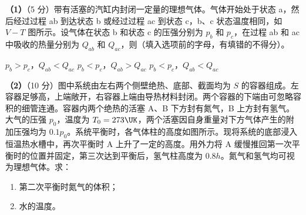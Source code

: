 \documentclass[\gkver]{gaokaozhenti}
\begin{document}
\begin{enumerate}
\textbf{（1）}（5 分）带有活塞的汽缸内封闭一定量的理想气体。气体开始处于状态 a，然后经过过程 ab 到达状态 b 或经过过程 ac 到状态 c，b、c 状态温度相同，如 $V-T$ 图所示。设气体在状态 b 和状态 c 的压强分别为 $p_{b}$ 和 $p_{c}$，在过程 ab 和 ac 中吸收的热量分别为 $Q_{ab}$ 和 $Q_{ac}$，则（填入选项前的字母，有填错的不得分）。


{$p_{b}>p_{c}$，$Q_{ab}<Q_{ac}$}
{$p_{b}<p_{c}$，$Q_{ab}>Q_{ac}$}
{$p_{b}<p_{c}$，$Q_{ab}<Q_{ac}$}

\textbf{（2）}（10 分）图中系统由左右两个侧壁绝热、底部、截面均为 $S$ 的容器组成。左容器足够高，上端敞开，右容器上端由导热材料封闭。两个容器的下端由可忽略容积的细管连通。容器内两个绝热的活塞 A、B 下方封有氮气，B 上方封有氢气。大气的压强 $p_{0}$，温度为 $T_{0}=273\UK$，两个活塞因自身重量对下方气体产生的附加压强均为 $0.1p_{0}$。系统平衡时，各气体柱的高度如图所示。现将系统的底部浸入恒温热水槽中，再次平衡时 A 上升了一定的高度。用外力将 A 缓慢推回第一次平衡时的位置并固定，第三次达到平衡后，氢气柱高度为 $0.8h$。氮气和氢气均可视为理想气体。求：

\begin{enumerate}
	\item
	第二次平衡时氮气的体积；
	\item
	水的温度。
\end{enumerate}


\end{enumerate}
\end{document}
